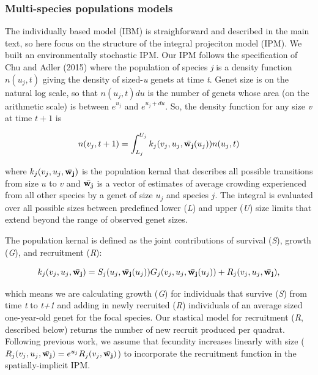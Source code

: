 \documentclass[12pt,]{article}
\begin{document}
\subsubsection{Multi-species populations
models}\label{multi-species-populations-models}

The individually based model (IBM) is straighforward and described in
the main text, so here focus on the structure of the integral projeciton
model (IPM). We built an environmentally stochastic IPM. Our IPM follows
the specification of Chu and Adler (2015) where the population of
species \emph{j} is a density function \(n(u_{j},t)\) giving the density
of sized-\emph{u} genets at time \emph{t}. Genet size is on the natural
log scale, so that \(n(u_{j},t)du\) is the number of genets whose area
(on the arithmetic scale) is between \(e^{u_{j}}\) and \(e^{u_{j}+du}\).
So, the density function for any size \emph{v} at time \(t+1\) is

\begin{equation}
n(v_{j},t+1) = \int_{L_{j}}^{U_{j}} k_{j}(v_{j},u_{j},\bar{\bold{w_{j}}}(u_{j}))n(u_{j},t)
\end{equation}

where \(k_{j}(v_{j},u_{j},\bar{\bold{w_{j}}})\) is the population kernal
that describes all possible transitions from size \(u\) to \(v\) and
\(\bar{\bold{w_{j}}}\) is a vector of estimates of average crowding
experienced from all other species by a genet of size \(u_j\) and
species \(j\). The integral is evaluated over all possible sizes between
predefined lower (\emph{L}) and upper (\emph{U}) size limits that extend
beyond the range of observed genet sizes.

The population kernal is defined as the joint contributions of survival
(\emph{S}), growth (\emph{G}), and recruitment (\emph{R}):

\begin{equation}
k_{j}(v_{j},u_{j},\bar{\bold{w_{j}}}) = S_j(u_j, \bar{\bold{w_{j}}}(u_{j}))G_j(v_{j},u_{j},\bar{\bold{w_{j}}}(u_{j})) + R_j(v_{j},u_{j},\bar{\bold{w_{j}}}),
\end{equation}

\noindent{} which means we are calculating growth (\emph{G}) for
individuals that survive (\emph{S}) from time \emph{t} to \emph{t+1} and
adding in newly recruited (\emph{R}) individuals of an average sized
one-year-old genet for the focal species. Our stastical model for
recruitment (\emph{R}, described below) returns the number of new
recruit produced per quadrat. Following previous work, we assume that
fecundity increases linearly with size
(\(R_j(v_{j},u_{j},\bar{\bold{w_{j}}}) = e^{u_j}R_j(v_{j},\bar{\bold{w_{j}}})\))
to incorporate the recruitment function in the spatially-implicit IPM.
\end{document}
